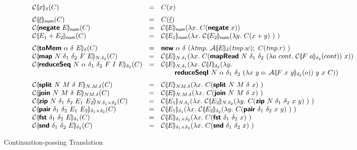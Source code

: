 \begin{figure}
  \begin{displaymath}
    \begin{array}{lcl}
      \semE{x}_\delta(C)
      &=& C(x)
      \medskip\\
      \semE{\underline{\ell}}_{\num}(C)
      &=& C(\underline{\ell})
      \\
      \semE{\prim{negate}~E}_{\num}(C)
      &=& \semE{E}_{\num}(\lambda x.~C(\prim{negate}~x))
      \\
      \semE{E_1 + E_2}_{\num}(C)
      &=& \semE{E_1}_{\num}(\lambda x.~\semE{E_2}_{\num}(\lambda y.~C(x+y)~)~)
      \medskip\\

      \semE{\prim{toMem}~\alpha~\delta~E}_{\delta}(C)
        &=& \prim{new}~\alpha~\delta~(\lambda \mathit{tmp}.~\semA{E}_{\delta}(\mathit{tmp}.w);~C(\mathit{tmp}.r)~)
      \\
      \semE{\prim{map}~N~\delta_1~\delta_2~F~E}_{N.\delta_2}(C)
        &=& \semE{E}_{N.\delta_1}(\lambda x.~C(\prim{mapRead}~N~\delta_1~\delta_2~(\lambda a~cont.~\semE{F~a}_{\delta_2}(cont))~x))
      \\
      \semE{\prim{reduceSeq}~N~\alpha~\delta_1~\delta_2~F~I~E}_{\delta_2}(C)
      &=& \begin{array}[t]{@{}l}
            \semE{E}_{N.\delta_1}(\lambda x.~
            \semE{I}_{\delta_2}(\lambda y.\\
          \quad\quad \prim{reduceSeqI}~N~\alpha~\delta_1~\delta_2~(\lambda x~y~o.~\semA{F~x~y}_{\delta_2}(o))~y~x~C))
          \end{array}
      \medskip\\

      \semE{\prim{split}~N~M~\delta~E}_{N.M.\delta}(C)
      &=& \semE{E}_{NM.\delta}(\lambda x.~C(\prim{split}~N~M~\delta~x)~)
      \\
      \semE{\prim{join}~N~M~\delta~E}_{NM.\delta}(C)
      &=& \semE{E}_{N.M.\delta}(\lambda x.~C(\prim{join}~N~M~\delta~x)~)
      \\
      \semE{\prim{zip}~N~\delta_1~\delta_2~E_1~E_2}_{N.\delta_1 \times \delta_2}(C)
      &=& \semE{E_1}_{N.\delta_1}(\lambda x.~\semE{E_2}_{N.\delta_2}(\lambda y.~C(\prim{zip}~N~\delta_1~\delta_2~x~y)~)~)
      \\
      \semE{\prim{pair}~\delta_1~\delta_2~E_1~E_2}_{\delta_1\times\delta_2}(C)
      &=& \semE{E_1}_{\delta_1}(\lambda x.~\semE{E_2}_{\delta_2}(\lambda y.~C(\prim{pair}~\delta_1~\delta_2~x~y)~)~)
      \\
      \semE{\prim{fst}~\delta_1~\delta_2~E}_{\delta_1}(C)
      &=& \semE{E}_{\delta_1\times\delta_2}(\lambda x.~C(\prim{fst}~\delta_1~\delta_2~x)~)
      \\
      \semE{\prim{snd}~\delta_1~\delta_2~E}_{\delta_2}(C)
      &=& \semE{E}_{\delta_1\times\delta_2}(\lambda x.~C(\prim{snd}~\delta_1~\delta_2~x)~)
      \\
    \end{array}
  \end{displaymath}
  \caption{Continuation-passing Translation}\label{fig:con-trans}
\end{figure}

